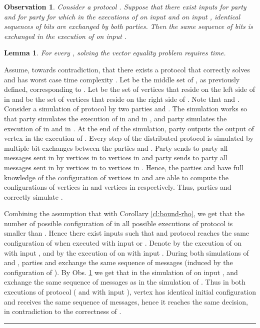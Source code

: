 \documentclass[11pt,letter]{article}
\newtheorem{lemma}[theorem]{Lemma}
\newtheorem{observation}[theorem]{Observation}
\newcommand{\qed}{\rule{7pt}{7pt}}
\newenvironment{proof}{\noindent{\bf Proof}\hspace*{1em}}{\qed\bigskip}
\begin{document}
\begin{observation} \label{l:similar-executions}
Consider a protocol .  Suppose that there exist inputs 
 for party  and  for party  
for which   in the executions of  on input  and 
on input , identical sequences of bits are exchanged by both parties. 
Then  the same sequence of bits is exchanged in the execution of 
 on input .
\end{observation}

\begin{lemma}
\label{l:EQ-LB}
For every , solving the vector equality problem 
 requires  time.
\end{lemma}

\begin{proof}
Assume, towards contradiction, that there exists a protocol  that 
correctly solves   and has worst case time complexity 
. Let  be the middle set of , 
as previously defined, corresponding to . Let  be 
the set of vertices  that reside on the left side of  in  
and  be the set of vertices that reside on the right side of 
. Note that  and 
.
Consider a simulation of protocol  by two parties  and .
The simulation works so that party  simulates the execution of  
in  and in , and party  simulates the 
execution of  in  and in . 
At the end of the simulation, party  outputs the output of vertex  
in the execution of . Every step of the distributed protocol  
is simulated by multiple bit exchanges between the parties  and . 
Party  sends to party   all messages sent in  by vertices in 
 to vertices in  and  party sends to party  
all messages sent in  by vertices in  to vertices in 
. Hence, the parties  and  have full knowledge of the 
configuration of vertices in  and are able to compute the 
configurations of vertices in  and vertices in  
respectively. Thus, parties  and   correctly simulate .

Combining the assumption that  with Corollary 
\ref{cl:bound-rho}, we get that the number of possible configuration of 
 in all possible executions of protocol  is smaller than 
. 
Hence there exist inputs  such that  
and protocol  reaches the same configuration of  when 
executed with input 
 or . 
Denote by  the execution of  on  with input 
, and by  the execution of  on  with 
input .
During both simulations of  and , parties  and 
 exchange the same sequence of messages (induced by the configuration 
of ). By Obs. \ref{l:similar-executions} we get that in the 
simulation of  on input 
,  and  exchange the same 
sequence of messages as in the simulation of .  Thus in both executions 
of protocol  ( and  with input ), 
vertex  has identical initial configuration and receives the same 
sequence of messages, hence it reaches the same decision,
in contradiction to the correctness of .
\end{proof}
\end{document}
